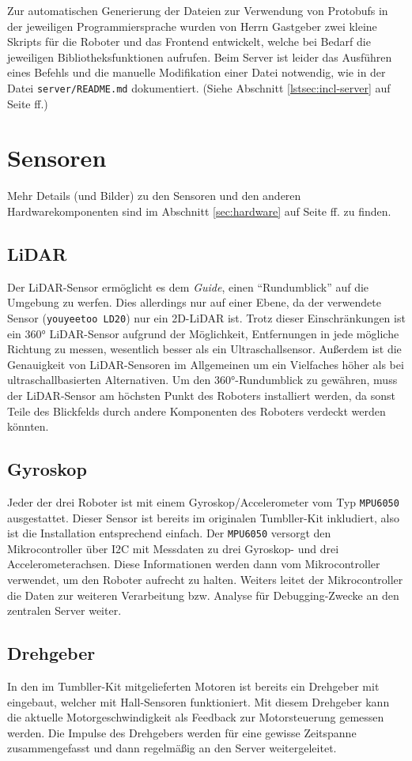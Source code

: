 Zur automatischen Generierung der Dateien zur Verwendung von Protobufs in der jeweiligen Programmiersprache
wurden von Herrn Gastgeber zwei kleine Skripts für die Roboter und das Frontend entwickelt,
welche bei Bedarf die jeweiligen Bibliotheksfunktionen aufrufen.
%
Beim Server ist leider das Ausführen eines Befehls und die manuelle Modifikation einer Datei notwendig,
wie in der Datei \texttt{server/README.md} dokumentiert. (Siehe Abschnitt \ref{lstsec:incl-server} auf Seite \pageref{lstsec:incl-server} ff.) 

\section{Sensoren}
\label{subsec:ueberblick_sensors}
Mehr Details (und Bilder) zu den Sensoren und den anderen Hardwarekomponenten sind im
Abschnitt \ref{sec:hardware} auf Seite \pageref{sec:hardware} ff. zu finden.

\subsection{LiDAR}
\label{subsec:ueberblick_lidar}
Der LiDAR-Sensor ermöglicht es dem \textit{Guide},
einen ``Rundumblick'' auf die Umgebung zu werfen.
%
Dies allerdings nur auf einer Ebene,
da der verwendete Sensor (\texttt{youyeetoo LD20})
nur ein 2D-LiDAR ist.
%
Trotz dieser Einschränkungen ist ein 360° LiDAR-Sensor aufgrund der Möglichkeit,
Entfernungen in jede mögliche Richtung zu messen,
wesentlich besser als ein Ultraschallsensor.
%
Außerdem ist die Genauigkeit von LiDAR-Sensoren im Allgemeinen
um ein Vielfaches höher als bei ultraschallbasierten Alternativen.
%
Um den 360°-Rundumblick zu gewähren,
muss der LiDAR-Sensor am höchsten Punkt des Roboters installiert werden,
da sonst Teile des Blickfelds
durch andere Komponenten des Roboters verdeckt werden könnten.

\subsection{Gyroskop}
Jeder der drei Roboter ist mit einem Gyroskop/Accelerometer vom Typ \texttt{MPU6050} ausgestattet.
%
Dieser Sensor ist bereits im originalen Tumbller-Kit inkludiert, also ist die Installation entsprechend einfach.
%
Der \texttt{MPU6050} versorgt den Mikrocontroller über I2C mit Messdaten zu drei Gyroskop- und drei Accelerometerachsen.
%
Diese Informationen werden dann vom Mikrocontroller verwendet, um den Roboter aufrecht zu halten.
%
Weiters leitet der Mikrocontroller die Daten zur weiteren Verarbeitung bzw. Analyse für Debugging-Zwecke an den zentralen Server weiter.

\subsection{Drehgeber}
\label{subsec:ueberblick_rot_enc}
In den im Tumbller-Kit mitgelieferten Motoren ist bereits ein Drehgeber mit eingebaut,
welcher mit Hall-Sensoren funktioniert.
%
Mit diesem Drehgeber kann die aktuelle Motorgeschwindigkeit als Feedback zur Motorsteuerung gemessen werden.
%
Die Impulse des Drehgebers werden für eine gewisse Zeitspanne zusammengefasst und dann regelmäßig an den Server weitergeleitet.